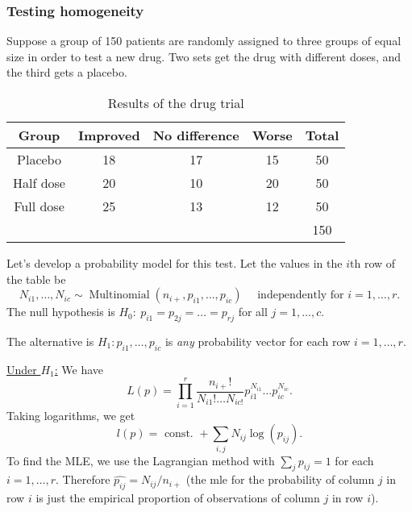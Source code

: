 \documentclass[egregdoesnotlikesansseriftitles,a4paper]{scrartcl}
\begin{document}
\subsubsection*{Testing homogeneity}
Suppose a group of 150 patients are randomly assigned to three groups of equal size in order to test a new drug. Two sets get the drug with different doses, and the third gets a placebo.
\begin{table}[h]
     \caption{Results of the drug trial}
     \centering
     \begin{tabular}{c|ccc|c}
          Group & Improved & No difference & Worse & Total\\
          \hline
          Placebo &18&17&15&50\\
          Half dose & 20&10 &20&50\\
          Full dose& 25&13&12&50\\
          \hline
          &&&&150
     \end{tabular}
\end{table}

Let's develop a probability model for this test. Let the values in the $i$th row of the table be \[
N_{i1}, \ldots, N_{ic} \sim \operatorname{Multinomial}(n_{i+},p_{i1},\ldots, p_{ic}) \quad \text{ independently for } i=1, \ldots,r
.\] The null hypothesis is $H_0 : \ p_{i1}=p_{2j}=\ldots=p_{rj}$ for all $j =1 , \ldots,c$. 

The alternative is $H_1 : p_{i1},\ldots, p_{ic}$ is \emph{any} probability vector for each row $i=1,\ldots,r$. 

\underline{Under $H_1$:} We have \[
L (p)= \prod_{i=1}^{r} \frac{n_{i+}!}{N_{i1}! \ldots N_{ic !}}p_{i1}^{N_{i1}}\ldots p_{ic}^{N_{ic}}
.\] Taking logarithms, we get \[
l (p)= \text{ const. }+ \sum_{i,j}^{}N_{ij}\log (p_{ij})
.\] To find the MLE, we use the Lagrangian method with $\sum_{j}^{}p_{ij}=1$ for each $i=1, \ldots,r$. Therefore $\hat{p_{ij}}= N_{ij}/n_{i+}$ (the mle for the probability of column $j$ in row $i$ is just the empirical proportion of observations of column $j$ in row $i$).
\end{document}
